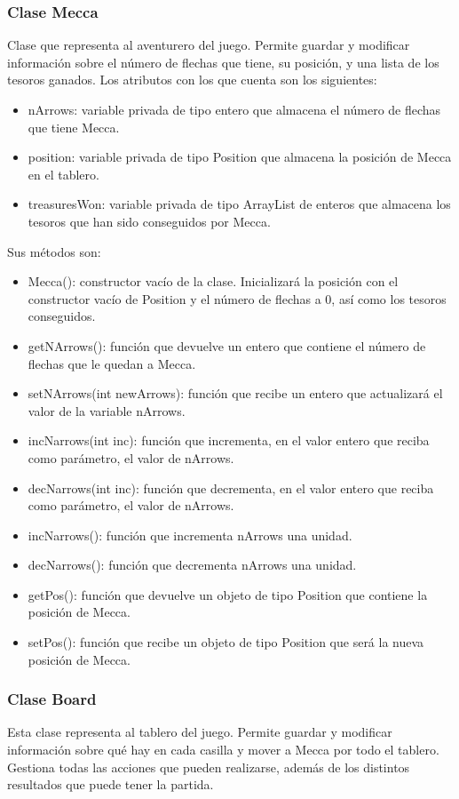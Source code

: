 \documentclass[a4paper,12pt,twoside,openright]{report}
\begin{document}
    \subsubsection{Clase Mecca}
    Clase que representa al aventurero del juego. Permite guardar y modificar información sobre el número de flechas que tiene, 
    su posición, y una lista de los tesoros ganados.
    Los atributos con los que cuenta son los siguientes:
    \begin{itemize}
     \item nArrows: variable privada de tipo entero que almacena el número de flechas que tiene Mecca.
     \item position: variable privada de tipo Position que almacena la posición de Mecca en el tablero. 
     \item treasuresWon: variable privada de tipo ArrayList de enteros que almacena los tesoros que han sido conseguidos por Mecca.
    \end{itemize}
    Sus métodos son:
    \begin{itemize}
     \item Mecca(): constructor vacío de la clase. Inicializará la posición con el constructor vacío de Position y 
     el número de flechas a 0, así como los tesoros conseguidos.
     \item getNArrows(): función que devuelve un entero que contiene el número de flechas que le quedan a Mecca.
     \item setNArrows(int newArrows): función que recibe un entero que actualizará el valor de la variable nArrows.
     \item incNarrows(int inc): función que incrementa, en el valor entero que reciba como parámetro, el valor de nArrows.
     \item decNarrows(int inc): función que decrementa, en el valor entero que reciba como parámetro, el valor de nArrows.
     \item incNarrows(): función que incrementa nArrows una unidad.
     \item decNarrows(): función que decrementa nArrows una unidad.
     \item getPos(): función que devuelve un objeto de tipo Position que contiene la posición de Mecca.
     \item setPos(): función que recibe un objeto de tipo Position que será la nueva posición de Mecca.
    \end{itemize}
   \subsubsection{Clase Board}
   Esta clase representa al tablero del juego. Permite guardar y modificar información sobre qué hay en cada casilla y 
   mover a Mecca por todo el tablero. Gestiona todas las acciones que pueden realizarse, además de los distintos resultados 
   que puede tener la partida.
   
\end{document}
